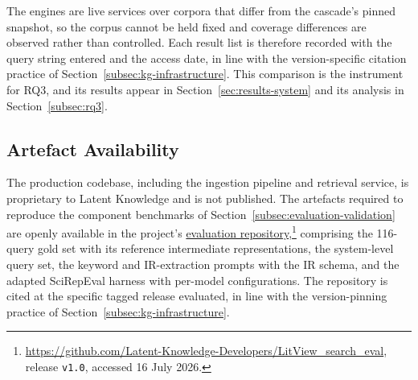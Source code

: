 The engines are live services over corpora that differ from the cascade's pinned snapshot, so the corpus cannot be held fixed and coverage differences are observed rather than controlled. Each result list is therefore recorded with the query string entered and the access date, in line with the version-specific citation practice of Section~\ref{subsec:kg-infrastructure}. This comparison is the instrument for RQ3, and its results appear in Section~\ref{sec:results-system} and its analysis in Section~\ref{subsec:rq3}.

\subsection{Artefact Availability}
The production codebase, including the ingestion pipeline and retrieval
service, is proprietary to Latent Knowledge and is not published. The
artefacts required to reproduce the component benchmarks of
Section~\ref{subsec:evaluation-validation} are openly available in the project's
\href{https://github.com/Latent-Knowledge-Developers/LitView_search_eval}{evaluation
repository},\footnote{\url{https://github.com/Latent-Knowledge-Developers/LitView_search_eval},
release \texttt{v1.0}, accessed 16 July 2026.} comprising the 116-query
gold set with its reference intermediate representations, the
system-level query set, the keyword and IR-extraction prompts with the
IR schema, and the adapted SciRepEval harness with per-model
configurations. The repository is cited at the specific tagged release
evaluated, in line with the version-pinning practice of
Section~\ref{subsec:kg-infrastructure}.